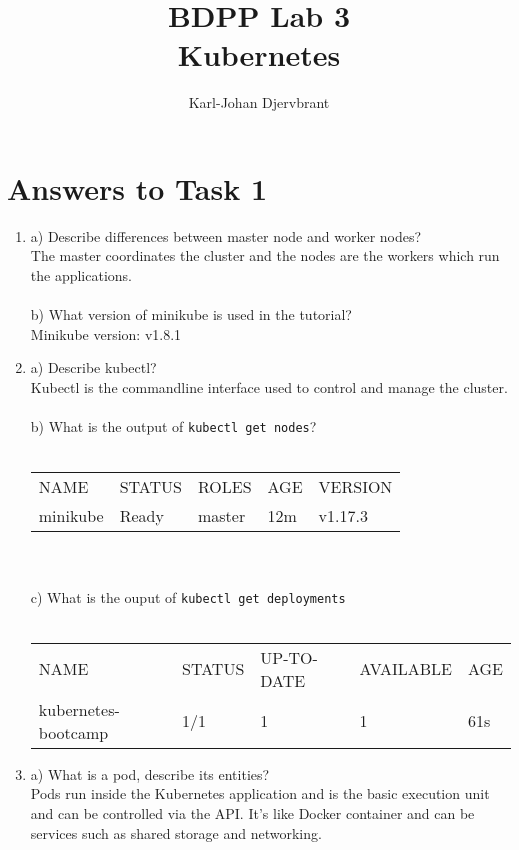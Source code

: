 \documentclass{article}
\title{BDPP Lab 3 \\ Kubernetes}
\author{Karl-Johan Djervbrant}
\begin{document}
    \maketitle

    \section{Answers to Task 1}
    \begin{enumerate}
        \item a) Describe differences between master node and worker nodes? \\
        The master coordinates the cluster and the nodes are the workers which run the applications.
        \\\\
        b) What version of minikube is used in the tutorial? \\
        Minikube version: v1.8.1
        \item a) Describe kubectl? \\
        Kubectl is the commandline interface used to control and manage the cluster.
        \\\\
        b) What is the output of \texttt{kubectl get nodes}?\\\\
        \begin{tabular}{lllll}
            NAME & STATUS & ROLES & AGE & VERSION \\
            minikube & Ready & master & 12m & v1.17.3
        \end{tabular}
        \\\\
        c) What is the ouput of \texttt{kubectl get deployments}\\\\
        \begin{tabular}{lllll}
            NAME & STATUS & UP-TO-DATE & AVAILABLE & AGE \\
            kubernetes-bootcamp & 1/1 & 1 & 1 & 61s
        \end{tabular}
        \item a) What is a pod, describe its entities? \\
        Pods run inside the Kubernetes application and is the basic execution unit and can be controlled via 
        the API. It's like Docker container and can be services such as shared storage and networking.
        \\\\

\end{enumerate}
\end{document}
